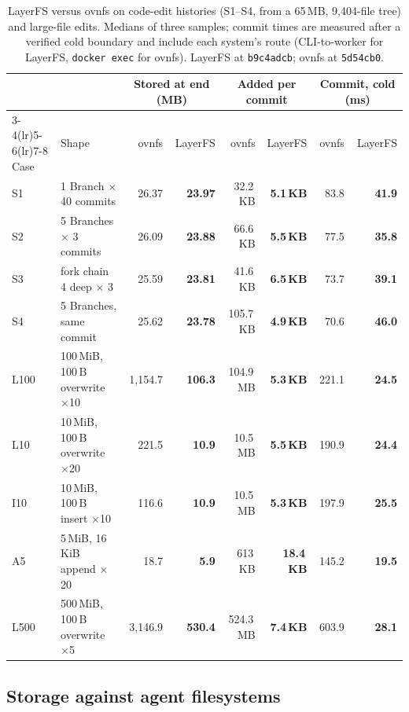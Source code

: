 \documentclass[letterpaper,twocolumn,10pt]{article}
\newcommand{\sys}{LayerFS}
\begin{document}
\begin{table}[t]
\centering
\small
\begin{tabular}{l l r r r r r r}
\toprule
& & \multicolumn{2}{c}{Stored at end (MB)} & \multicolumn{2}{c}{Added per commit} &
\multicolumn{2}{c}{Commit, cold (ms)} \\
\cmidrule(lr){3-4}\cmidrule(lr){5-6}\cmidrule(lr){7-8}
Case & Shape & ovnfs & \sys{} & ovnfs & \sys{} & ovnfs & \sys{} \\
\midrule
S1 & 1 Branch $\times$ 40 commits        & 26.37 & \textbf{23.97} & 32.2\,KB & \textbf{5.1\,KB} & 83.8 & \textbf{41.9} \\
S2 & 5 Branches $\times$ 3 commits       & 26.09 & \textbf{23.88} & 66.6\,KB & \textbf{5.5\,KB} & 77.5 & \textbf{35.8} \\
S3 & fork chain 4 deep $\times$ 3        & 25.59 & \textbf{23.81} & 41.6\,KB & \textbf{6.5\,KB} & 73.7 & \textbf{39.1} \\
S4 & 5 Branches, same commit             & 25.62 & \textbf{23.78} & 105.7\,KB & \textbf{4.9\,KB} & 70.6 & \textbf{46.0} \\
\midrule
L100 & 100\,MiB, 100\,B overwrite $\times$10 & 1,154.7 & \textbf{106.3} & 104.9\,MB & \textbf{5.3\,KB} & 221.1 & \textbf{24.5} \\
L10  & 10\,MiB, 100\,B overwrite $\times$20  & 221.5 & \textbf{10.9} & 10.5\,MB & \textbf{5.5\,KB} & 190.9 & \textbf{24.4} \\
I10  & 10\,MiB, 100\,B insert $\times$10     & 116.6 & \textbf{10.9} & 10.5\,MB & \textbf{5.3\,KB} & 197.9 & \textbf{25.5} \\
A5   & 5\,MiB, 16\,KiB append $\times$20     & 18.7 & \textbf{5.9} & 613\,KB & \textbf{18.4\,KB} & 145.2 & \textbf{19.5} \\
L500 & 500\,MiB, 100\,B overwrite $\times$5  & 3,146.9 & \textbf{530.4} & 524.3\,MB & \textbf{7.4\,KB} & 603.9 & \textbf{28.1} \\
\bottomrule
\end{tabular}
\caption{\sys{} versus ovnfs on code-edit histories (S1--S4, from a 65\,MB,
9,404-file tree) and large-file edits. Medians of three samples; commit
times are measured after a verified cold boundary and include each system's
route (CLI-to-worker for \sys{}, \texttt{docker exec} for ovnfs). \sys{} at
\texttt{b9c4adcb}; ovnfs at \texttt{5d54cb0}.}
\label{tab:ovnfs}
\end{table}

\subsection{Storage against agent filesystems}
\label{sec:eval-storage}
\end{document}
